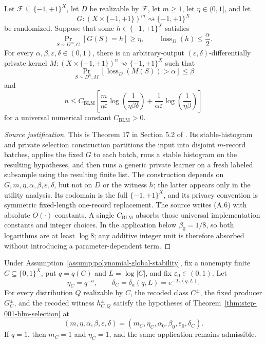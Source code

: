 \begin{theorem}
\label{thm:step-001-blm-selection}
Let \(\mathcal F\subseteq\{-1,+1\}^X\), let \(D\) be realizable by
\(\mathcal F\), let \(m\geq1\), let \(\eta\in(0,1]\), and let
\[
G:(X\times\{-1,+1\})^m
\rightsquigarrow\{-1,+1\}^X
\]
be randomized.  Suppose that some \(h\in\{-1,+1\}^X\) satisfies
\[
\Pr_{S\sim D^m,G}[G(S)=h]\geq\eta,
\qquad
\operatorname{loss}_D(h)\leq\frac{\alpha}{2}.
\]
For every \(\alpha,\beta,\varepsilon,\delta\in(0,1)\), there is an
arbitrary-output \((\varepsilon,\delta)\)-differentially private
kernel \(M:(X\times\{-1,+1\})^n
\rightsquigarrow\{-1,+1\}^X\) such that
\[
\Pr_{S\sim D^n,M}
[\operatorname{loss}_D(M(S))>\alpha]\leq\beta
\]
and
\[
n\leq C_{\mathrm{BLM}}
\left[
\frac{m}{\eta\varepsilon}
\log\!\left(\frac1{\eta\beta\delta}\right)
+
\frac1{\alpha\varepsilon}
\log\!\left(\frac1{\eta\beta}\right)
\right]
\tag{A.6}
\]
for a universal numerical constant \(C_{\mathrm{BLM}}>0\).
\end{theorem}

\begin{proof}[Source justification]
This is Theorem 17 in Section 5.2 of
\citet{bun2021equivalence}.  Its stable-histogram and private
selection construction partitions the input into disjoint
\(m\)-record batches, applies the fixed \(G\) to each batch, runs a
stable histogram on the resulting hypotheses, and then runs a generic
private learner on a fresh labeled subsample using the resulting
finite list.  The construction depends on
\(G,m,\eta,\alpha,\beta,\varepsilon,\delta\), but not on \(D\) or the
witness \(h\); the latter appears only in the utility analysis.  Its
codomain is the full \(\{-1,+1\}^X\), and its privacy convention is
symmetric fixed-length one-record replacement.  The source writes
(A.6) with absolute \(O(\cdot)\) constants.  A single
\(C_{\mathrm{BLM}}\) absorbs those universal implementation constants
and integer choices.  In the application below
\(\beta_0=1/8\), so both logarithms are at least \(\log 8\); any
additive integer unit is therefore absorbed without introducing a
parameter-dependent term.
\end{proof}

\begin{lemma}\label{lem:step-001-blm-admissibility}
Under Assumption~\ref{assump:polynomial-global-stability}, fix a
nonempty finite \(C\subseteq\{0,1\}^X\), put \(q=q(C)\) and
\(L=\log|C|\), and fix \(\varepsilon_0\in(0,1)\).  Let
\[
\eta_C=q^{-a},\qquad
\delta_C=\delta_a(q,L)=e^{-T_a(q,L)}.
\]
For every distribution \(Q\) realizable by \(C\), the recoded class
\(C^\pm\), the fixed producer \(G_C^\pm\), and the recoded witness
\(h_{C,Q}^\pm\) satisfy the hypotheses of
Theorem~\ref{thm:step-001-blm-selection} at
\[
(m,\eta,\alpha,\beta,\varepsilon,\delta)
=(m_C,\eta_C,\alpha_0,\beta_0,\varepsilon_0,\delta_C).
\]
If \(q=1\), then \(m_C=1\) and \(\eta_C=1\), and the same application
remains admissible.
\end{lemma}

